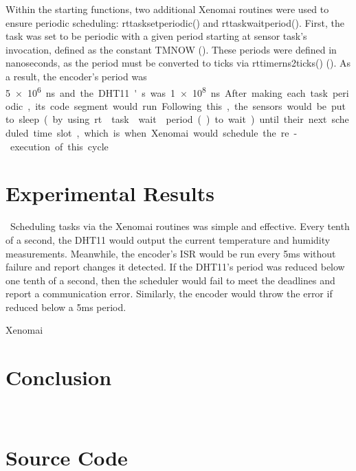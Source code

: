 \documentclass[letterpaper, 12pt]{article}
\begin{document}
\indent Within the starting functions, two additional Xenomai routines were used to ensure periodic scheduling: rt\textunderscore task\textunderscore set\textunderscore periodic() and rt\textunderscore task\textunderscore wait\textunderscore period().  First, the task was set to be periodic with a given period starting at sensor task's invocation, defined as the constant TM\textunderscore NOW (\cite{xenomai2018}).  These periods were defined in nanoseconds, as the period must be converted to ticks via rt\textunderscore timer\textunderscore ns2ticks() (\cite{xenomai2018}).  As a result, the encoder's period was \SI{5e6} ns and the DHT11's was \SI{1e8} ns.  After making each task periodic, its code segment would run.  Following this, the sensors would be put to sleep (by using rt\textunderscore task\textunderscore wait\textunderscore period() to wait) until their next scheduled time slot, which is when Xenomai would schedule the re-execution of this cycle.
~\newpage
\section{Experimental Results}
~\indent Scheduling tasks via the Xenomai routines was simple and effective.  Every tenth of a second, the DHT11 would output the current temperature and humidity measurements.  Meanwhile, the encoder's ISR would be run every 5ms without failure and report changes it detected.  If the DHT11's period was reduced below one tenth of a second, then the scheduler would fail to meet the deadlines and report a communication error.  Similarly, the encoder would throw the error if reduced below a 5ms period.  

\indent Xenomai
~\newpage
\section{Conclusion}

~\newpage
\printbibliography
~\newpage
\section{Source Code}

\end{document}
